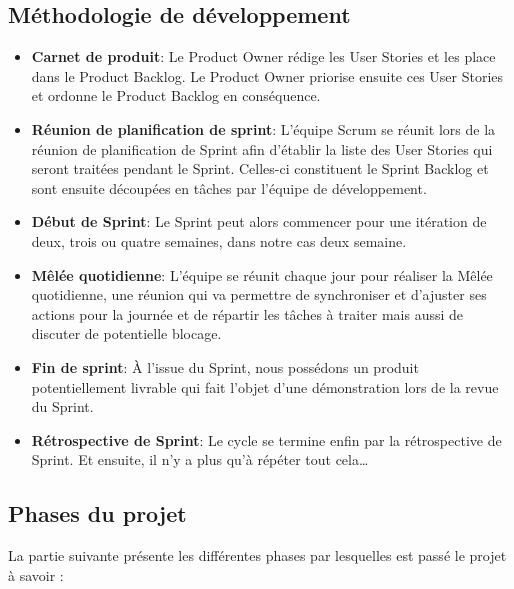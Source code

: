 \subsection{Méthodologie de développement}

\begin{itemize}
  \item \textbf{Carnet de produit}: 
        Le Product Owner rédige les User Stories et les place dans le Product Backlog.
        Le Product Owner priorise ensuite ces User Stories et ordonne le Product
        Backlog en conséquence.
    \\
    \item \textbf{Réunion de planification de sprint}: 
        L’équipe Scrum se réunit lors de la réunion de planification de Sprint afin
        d’établir la liste des User Stories qui seront traitées pendant le Sprint. Celles-ci
        constituent le Sprint Backlog et sont ensuite découpées en tâches par l’équipe
        de développement.
    \\    
    \item \textbf{Début de Sprint}: 
        Le Sprint peut alors commencer pour une itération de deux, trois ou quatre semaines, dans notre cas deux semaine.
    \\    
    \item \textbf{Mêlée quotidienne}: 
        L’équipe se réunit chaque jour pour réaliser la Mêlée quotidienne, une réunion qui va permettre de synchroniser et d'ajuster ses actions pour la journée et de répartir les tâches à traiter mais aussi de discuter de potentielle blocage.
    \\    
    \item \textbf{Fin de sprint}: 
        À l’issue du Sprint, nous possédons un produit potentiellement livrable qui fait l’objet d’une démonstration lors de la revue du Sprint.
    \\    
    \item \textbf{Rétrospective de Sprint}: 
        Le cycle se termine enfin par la rétrospective de Sprint. Et ensuite, il n’y a plus qu’à répéter tout cela…
\end{itemize}

\subsection{Phases du projet}

La partie suivante présente les différentes phases par lesquelles est passé le projet à savoir :
\\

